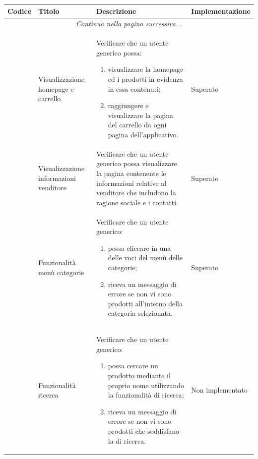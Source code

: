 \begin{center}
	\begin{longtable}{|p{0.85cm}|p{2.25cm}|p{9cm}|p{3cm}|}
		\hline
		\rowcolor{lighter-grayer}
		\textbf{Codice} & \textbf{Titolo} & \textbf{Descrizione} & \textbf{Implementazione} \\
		\hline
		\endfirsthead
		\hline
		\multicolumn{4}{|c|}{\textit{Continua nella pagina successiva...}} \\
		\hline
		\endfoot
		\endlastfoot

		\hline
		
		 & Visualizzazione homepage e carrello & Verificare che un utente generico possa:
		\begin{enumerate}
			\item  visualizzare la homepage ed i prodotti in evidenza in essa contenuti;
			\item  raggiungere e visualizzare la pagina del carrello da ogni pagina dell'applicativo.
		\end{enumerate} & Superato\\

		 & Visualizzazione informazioni venditore & Verificare che un utente generico possa visualizzare la pagina contenente le informazioni relative al venditore che includono la ragione sociale e i contatti. & Superato \\

		 & Funzionalità menù categorie & Verificare che un utente generico: 
		\begin{enumerate}
			\item  possa cliccare in una delle voci del menù delle categorie;
			\item  riceva un messaggio di errore se non vi sono prodotti all'interno della categoria selezionata.
		\end{enumerate} & Superato\\

		 & Funzionalità ricerca & Verificare che un utente generico: 
		\begin{enumerate}
			\item  possa cercare un prodotto mediante il proprio nome utilizzando la funzionalità di ricerca;
			\item  riceva un messaggio di errore se non vi sono prodotti che soddisfano la \glock{query} di ricerca.
		\end{enumerate} & Non implementato \\


\end{longtable}
\end{center}
